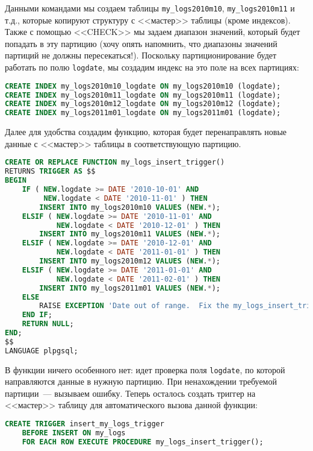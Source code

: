 Данными командами мы создаем таблицы \lstinline!my_logs2010m10!, \lstinline!my_logs2010m11! и т.д., которые копируют структуру с <<мастер>> таблицы (кроме индексов). Также с помощью <<CHECK>> мы задаем диапазон значений, который будет попадать в эту партицию (хочу опять напомнить, что диапазоны значений партиций не должны пересекаться!). Поскольку партиционирование будет работать по полю \lstinline!logdate!, мы создадим индекс на это поле на всех партициях:

\begin{lstlisting}[language=SQL,label=lst:partitioning4,caption=Создание индексов]
CREATE INDEX my_logs2010m10_logdate ON my_logs2010m10 (logdate);
CREATE INDEX my_logs2010m11_logdate ON my_logs2010m11 (logdate);
CREATE INDEX my_logs2010m12_logdate ON my_logs2010m12 (logdate);
CREATE INDEX my_logs2011m01_logdate ON my_logs2011m01 (logdate);
\end{lstlisting}

Далее для удобства создадим функцию, которая будет перенаправлять новые данные с <<мастер>> таблицы в соответствующую партицию.

\begin{lstlisting}[language=SQL,label=lst:partitioning5,caption=Функция для перенаправления]
CREATE OR REPLACE FUNCTION my_logs_insert_trigger()
RETURNS TRIGGER AS $$
BEGIN
    IF ( NEW.logdate >= DATE '2010-10-01' AND
         NEW.logdate < DATE '2010-11-01' ) THEN
        INSERT INTO my_logs2010m10 VALUES (NEW.*);
    ELSIF ( NEW.logdate >= DATE '2010-11-01' AND
            NEW.logdate < DATE '2010-12-01' ) THEN
        INSERT INTO my_logs2010m11 VALUES (NEW.*);
    ELSIF ( NEW.logdate >= DATE '2010-12-01' AND
            NEW.logdate < DATE '2011-01-01' ) THEN
        INSERT INTO my_logs2010m12 VALUES (NEW.*);
    ELSIF ( NEW.logdate >= DATE '2011-01-01' AND
            NEW.logdate < DATE '2011-02-01' ) THEN
        INSERT INTO my_logs2011m01 VALUES (NEW.*);
    ELSE
        RAISE EXCEPTION 'Date out of range.  Fix the my_logs_insert_trigger() function!';
    END IF;
    RETURN NULL;
END;
$$
LANGUAGE plpgsql;
\end{lstlisting}

В функции ничего особенного нет: идет проверка поля \lstinline!logdate!, по которой направляются данные в нужную партицию. При ненахождении требуемой партиции~--- вызываем ошибку. Теперь осталось создать триггер на <<мастер>> таблицу для автоматического вызова данной функции:

\begin{lstlisting}[language=SQL,label=lst:partitioning6,caption=Триггер]
CREATE TRIGGER insert_my_logs_trigger
    BEFORE INSERT ON my_logs
    FOR EACH ROW EXECUTE PROCEDURE my_logs_insert_trigger();
\end{lstlisting}


